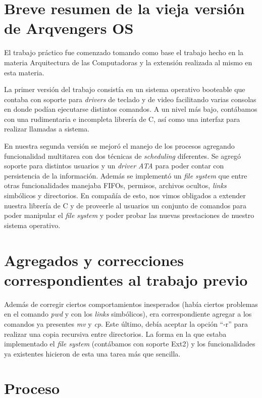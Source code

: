\documentclass[a4paper,10pt]{article}
\begin{document}
\newpage
\section{Breve resumen de la vieja versión de Arqvengers OS}
El trabajo práctico fue comenzado tomando como base el trabajo hecho en la materia Arquitectura de las Computadoras y la extensión 
realizada al mismo en esta materia.

La primer versión del trabajo consistía en un sistema operativo booteable que contaba con soporte para \textit{drivers} de
 teclado y de video facilitando varias consolas en donde podían ejecutarse distintos comandos. 
A un nivel más bajo, contábamos con una rudimentaria e incompleta librería de C, así como una interfaz para realizar 
llamadas a sistema.

En nuestra segunda versión se mejoró el manejo de los procesos agregando funcionalidad multitarea con dos técnicas de 
\textit{scheduling} diferentes. Se agregó soporte para distintos usuarios y un \textit{driver ATA} para poder contar con persistencia 
de la información. Además se implementó un \textit{file system} que entre otras funcionalidades manejaba FIFOs, permisos, 
archivos ocultos, \textit{links} simbólicos y directorios. En compañía de esto, nos vimos obligados a extender nuestra librería de 
C y de proveerle al usuarios un conjunto de comandos para poder manipular el \textit{file system} y poder probar las nuevas 
prestaciones de nuestro sistema operativo.

\newpage

\section{Agregados y correcciones correspondientes al trabajo previo}

Además de corregir ciertos comportamientos inesperados (había ciertos problemas en el comando \textit{pwd} y con los
\textit{links} simbólicos), era correspondiente agregar a los comandos ya presentes \textit{mv} y \textit{cp}. Este último, 
debía aceptar la opción ``-r'' para realizar una copia recursiva entre directorios. La forma en la que estaba implementado 
el \textit{file system} (contábamos con soporte Ext2) y los funcionalidades ya existentes hicieron de esta una tarea más que sencilla.

\newpage

\section{Proceso}
\end{document}
